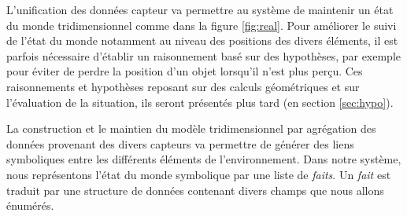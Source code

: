 \documentclass[a4paper,11pt,twoside]{StyleThese}
\begin{document}
L'unification des données capteur va permettre au système de maintenir un état du monde tridimensionnel comme dans la figure \ref{fig:real}. Pour améliorer le suivi de l'état du monde notamment au niveau des positions des divers éléments, il est parfois nécessaire d'établir un raisonnement basé sur des hypothèses, par exemple pour éviter de perdre la position d'un objet lorsqu'il n'est plus perçu. Ces raisonnements et hypothèses reposant sur des calculs géométriques et sur l'évaluation de la situation, ils seront présentés plus tard (en section \ref{sec:hypo}). 

La construction et le maintien du modèle tridimensionnel par agrégation des données provenant des divers capteurs va permettre de générer des liens symboliques entre les différents éléments de l'environnement. Dans notre système, nous représentons l'état du monde symbolique par une liste de \textit{faits}. Un \textit{fait} est traduit par une structure de données contenant divers champs que nous allons énumérés.
\end{document}
